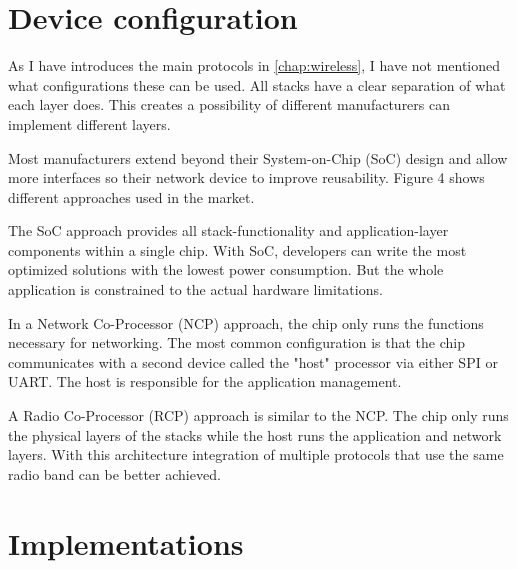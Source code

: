 \section{Device configuration}
\label{sec:multi:dc}
As I have introduces the main protocols in \autoref{chap:wireless}, I have not mentioned what configurations these can be used. All stacks have a clear separation of what each layer does. This creates a possibility of different manufacturers can implement different layers.

Most manufacturers extend beyond their System-on-Chip (SoC) design and allow more interfaces so their network device to improve reusability. Figure 4 shows different approaches used in the market.

The SoC approach provides all stack-functionality and application-layer components within a single chip. With SoC, developers can write the most optimized solutions with the lowest power consumption. But the whole application is constrained to the actual hardware limitations.

In a Network Co-Processor (NCP) approach, the chip only runs the functions necessary for networking. The most common configuration is that the chip communicates with a second device called the "host" processor via either SPI or UART. The host is responsible for the application management.
 
A Radio Co-Processor (RCP) approach is similar to the NCP. The chip only runs the physical layers of the stacks while the host runs the application and network layers. With this architecture integration of multiple protocols that use the same radio band can be better achieved.

\section{Implementations}
\label{sec:multi:imp}
